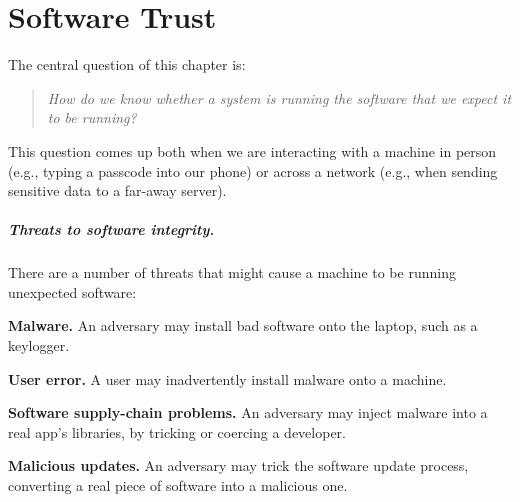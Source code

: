 \chapter{Software Trust}

The central question of this chapter is: 
\begin{quote}
\emph{How do we know whether a system is running the 
  software that we expect it to be running?}
\end{quote}
This question comes up both when we are interacting with a machine 
in person (e.g., typing a passcode into our phone) or across a network
(e.g., when sending sensitive data to a far-away server).


\paragraph{Threats to software integrity.}
There are a number of threats that might cause a machine to
be running unexpected software:
\begin{compactitem}
\item \textbf{Malware.} 
      An adversary may install bad software onto the laptop, such as a keylogger.
\item \textbf{User error.} A user may inadvertently install malware onto a
machine. 
\item \textbf{Software supply-chain problems.} 
      An adversary may inject malware into a real app's libraries, by tricking or coercing a developer.
\item \textbf{Malicious updates.} An adversary may trick the software update process, converting a real piece of software into a malicious one.
\end{compactitem}


